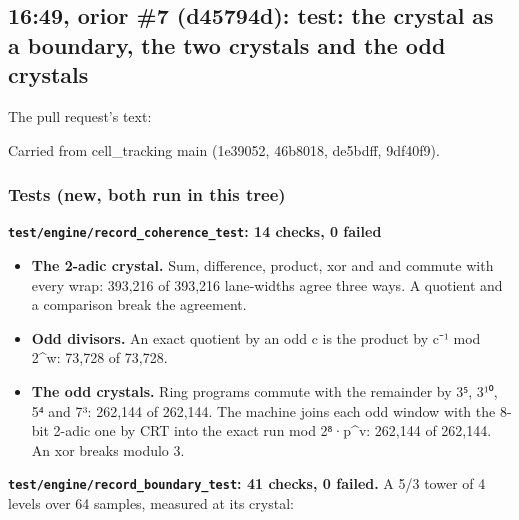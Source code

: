 \subsection{\texorpdfstring{16:49, orior \#7 (d45794d): test: the crystal as a boundary, the two crystals and the odd crystals}{16:49, orior \#7 (d45794d): test: the crystal as a boundary, the two crystals and the odd crystals}}

The pull request's text:

Carried from cell\_\allowbreak{}tracking main (1e39052, 46b8018, de5bdff, 9df40f9).

\subsubsection{\texorpdfstring{Tests (new, both run in this tree)}{Tests (new, both run in this tree)}}

\textbf{\texttt{test/\allowbreak{}engine/\allowbreak{}record\_\allowbreak{}coherence\_\allowbreak{}test}: 14 checks, 0 failed}

\begin{itemize}
\item \textbf{The 2-adic crystal.} Sum, difference, product, xor and and commute with every wrap: 393,216 of 393,216 lane-widths agree three ways. A quotient and a comparison break the agreement.
\item \textbf{Odd divisors.} An exact quotient by an odd c is the product by c⁻¹ mod 2\textasciicircum{}w: 73,728 of 73,728.
\item \textbf{The odd crystals.} Ring programs commute with the remainder by 3⁵, 3¹⁰, 5⁴ and 7³: 262,144 of 262,144. The machine joins each odd window with the 8-bit 2-adic one by CRT into the exact run mod 2⁸·p\textasciicircum{}v: 262,144 of 262,144. An xor breaks modulo 3.
\end{itemize}

\textbf{\texttt{test/\allowbreak{}engine/\allowbreak{}record\_\allowbreak{}boundary\_\allowbreak{}test}: 41 checks, 0 failed.} A 5/3 tower of 4 levels over 64 samples, measured at its crystal:

